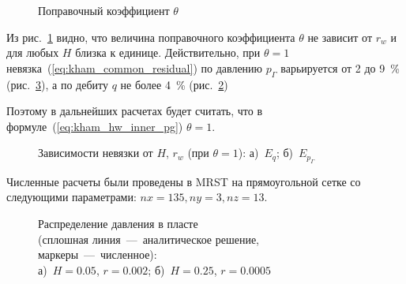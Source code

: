 \documentclass{article}
\begin{document}
\begin{figure}[H]
	\centering
	
	\caption{Поправочный коэффициент $\theta$}
	\label{fig:kham_hw_inner_theta_map}
\end{figure}

Из рис.~\ref{fig:kham_hw_inner_theta_map} видно, что величина поправочного коэффициента
$\theta$ не зависит от $r_w$ и для любых $H$ близка к единице.
Действительно, при $\theta=1$ невязка~(\ref{eq:kham_common_residual}) по давлению
$p_{\Gamma}$ варьируется от 2 до 9~\% (рис.~\ref{fig:kham_hw_inner_epg_map}), а по
дебиту $q$ не более 4~\% (рис.~\ref{fig:kham_hw_inner_eq_map})

Поэтому в дальнейших расчетах будет считать, что в формуле~(\ref{eq:kham_hw_inner_pg}) $\theta=1$.

\begin{figure}[H]
	\centering
	\begin{subfigure}{0.48\textwidth}
		\centering
		
		\caption{}
		\label{fig:kham_hw_inner_eq_map}
	\end{subfigure}
	\hfill
	\begin{subfigure}{0.48\textwidth}
		\centering
		
		\caption{}
		\label{fig:kham_hw_inner_epg_map}
	\end{subfigure}
	\caption{
		Зависимости невязки от $H$, $r_w$ (при $\theta=1$):
		а)~$E_q$;
		б)~$E_{p_{\Gamma}}$
	}
	\label{fig:kham_hw_inner_eq_epg_maps}
\end{figure}

Численные расчеты были проведены в MRST на прямоугольной сетке со следующими параметрами: $nx=  135, ny = 3, nz = 13$.

\begin{figure}[H]
	\centering
	\begin{subfigure}{0.48\textwidth}
		\centering
		
		\caption{}
		\label{fig:kham_hw_inner_p_worst_pg}
	\end{subfigure}
	\hfill
	\begin{subfigure}{0.48\textwidth}
		\centering
		
		\caption{}
		\label{fig:kham_hw_inner_p_best_pg}
	\end{subfigure}
	\caption{
		Распределение давления в пласте \\
		(сплошная линия~---~аналитическое решение, маркеры~---~численное): \\
		а)~$H = 0.05$, $r = 0.002$;
		б)~$H = 0.25$, $r = 0.0005$
	}
	\label{fig:kham_hw_inner_press_disrt}
\end{figure}
\end{document}
